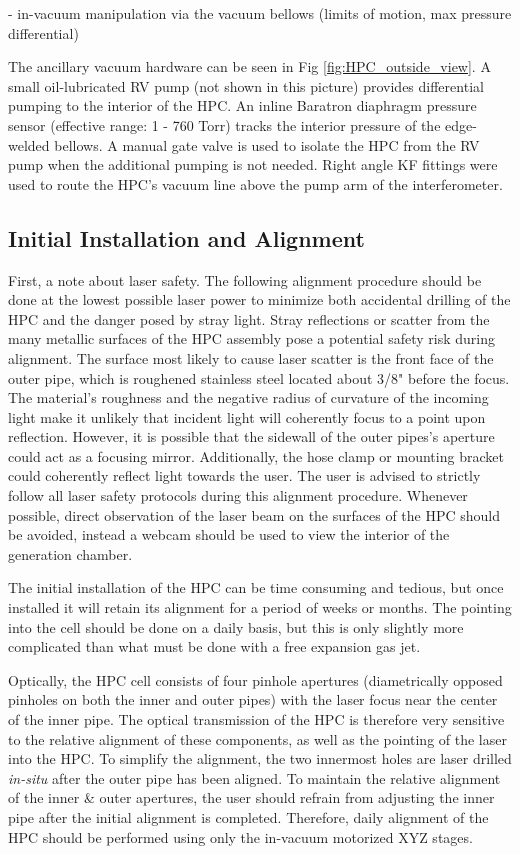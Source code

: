 - in-vacuum manipulation via the vacuum bellows (limits of motion, max pressure differential)

The ancillary vacuum hardware can be seen in Fig \ref{fig:HPC_outside_view}. A small oil-lubricated RV pump (not shown in this picture) provides differential pumping to the interior of the HPC. An inline Baratron diaphragm pressure sensor (effective range: 1 - 760 Torr) tracks the interior pressure of the edge-welded bellows. A manual gate valve is used to isolate the HPC from the RV pump when the additional pumping is not needed. Right angle KF fittings were used to route the HPC's vacuum line above the pump arm of the interferometer.


\subsection{Initial Installation and Alignment}
\label{app:initial-alignment-HPC}
First, a note about laser safety. The following alignment procedure should be done at the lowest possible laser power to minimize both accidental drilling of the HPC and the danger posed by stray light. Stray reflections or scatter from the many metallic surfaces of the HPC assembly pose a potential safety risk during alignment. The surface most likely to cause laser scatter is the front face of the outer pipe, which is roughened stainless steel located about 3/8" before the focus. The material's roughness and the negative radius of curvature of the incoming light make it unlikely that incident light will coherently focus to a point upon reflection. However, it is possible that the sidewall of the outer pipes's aperture could act as a focusing mirror. Additionally, the hose clamp or mounting bracket could coherently reflect light towards the user. The user is advised to strictly follow all laser safety protocols during this alignment procedure. Whenever possible, direct observation of the laser beam on the surfaces of the HPC should be avoided, instead a webcam should be used to view the interior of the generation chamber.

The initial installation of the HPC can be time consuming and tedious, but once installed it will retain its alignment for a period of weeks or months. The pointing into the cell should be done on a daily basis, but this is only slightly more complicated than what must be done with a free expansion gas jet.

Optically, the HPC cell consists of four pinhole apertures (diametrically opposed pinholes on both the inner and outer pipes) with the laser focus near the center of the inner pipe. The optical transmission of the HPC is therefore very sensitive to the relative alignment of these components, as well as the pointing of the laser into the HPC. To simplify the alignment, the two innermost holes are laser drilled \textit{in-situ} after the outer pipe has been aligned. To maintain the relative alignment of the inner \& outer apertures, the user should refrain from adjusting the inner pipe after the initial alignment is completed. Therefore, daily alignment of the HPC should be performed using only the in-vacuum motorized XYZ stages.

